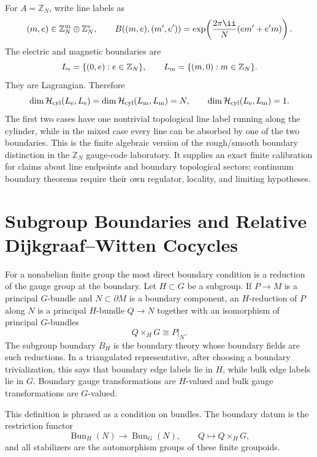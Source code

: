 For \(A=\mathbb Z_N\), write line labels as
\[
  (m,e)\in\mathbb Z_N^{\rm m}\oplus\mathbb Z_N^{\rm e},
  \qquad
  B((m,e),(m',e'))=
  \exp\!\left(\frac{2\pi\ii}{N}(em'+e'm)\right).
\]
The electric and magnetic boundaries are
\[
  L_{\rm e}=\{(0,e):e\in\mathbb Z_N\},
  \qquad
  L_{\rm m}=\{(m,0):m\in\mathbb Z_N\}.
\]
They are Lagrangian.  Therefore
\[
  \dim\mathcal H_{\rm cyl}(L_{\rm e},L_{\rm e})
  =
  \dim\mathcal H_{\rm cyl}(L_{\rm m},L_{\rm m})
  =
  N,
  \qquad
  \dim\mathcal H_{\rm cyl}(L_{\rm e},L_{\rm m})=1.
\]
The first two cases have one nontrivial topological line label running along
the cylinder, while in the mixed case every line can be absorbed by one of
the two boundaries.  This is the finite algebraic version of the rough/smooth
boundary distinction in the \(\mathbb Z_N\) gauge-code laboratory.  It
supplies an exact finite calibration for claims about line endpoints and
boundary topological sectors; continuum boundary theorems require their own
regulator, locality, and limiting hypotheses.

\section{Subgroup Boundaries and Relative Dijkgraaf--Witten Cocycles}
\label{sec:finite-subgroup-boundaries-relative-dw}

For a nonabelian finite group the most direct boundary condition is a
reduction of the gauge group at the boundary.  Let \(H\subset G\) be a
subgroup.  If \(P\to M\) is a principal \(G\)-bundle and \(N\subset\partial M\)
is a boundary component, an \(H\)-reduction of \(P\) along \(N\) is a
principal \(H\)-bundle \(Q\to N\) together with an isomorphism of principal
\(G\)-bundles
\[
  Q\times_H G\cong P|_N .
\]
The subgroup boundary \(B_H\) is the boundary theory whose boundary fields
are such reductions.  In a triangulated representative, after choosing a
boundary trivialization, this says that boundary edge labels lie in \(H\),
while bulk edge labels lie in \(G\).  Boundary gauge transformations are
\(H\)-valued and bulk gauge transformations are \(G\)-valued.

This definition is phrased as a condition on bundles.  The boundary datum is
the restriction functor
\[
  \operatorname{Bun}_H(N)\longrightarrow \operatorname{Bun}_G(N),
  \qquad
  Q\longmapsto Q\times_H G,
\]
and all stabilizers are the automorphism groups of these finite groupoids.

